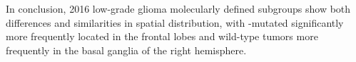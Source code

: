 In conclusion,  2016 low-grade glioma molecularly defined subgroups show both differences and similarities in spatial distribution, with -mutated  significantly more frequently located in the frontal lobes and  wild-type \glspl{tumor} more frequently in the basal ganglia of the right hemisphere.







